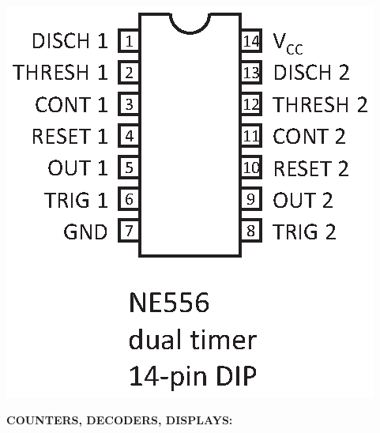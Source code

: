 \hspace{-0.1in}\includegraphics[scale=0.75]{appendices/pinouts/ne556_abrev.eps}


\medskip
\textbf{COUNTERS, DECODERS, DISPLAYS:}

